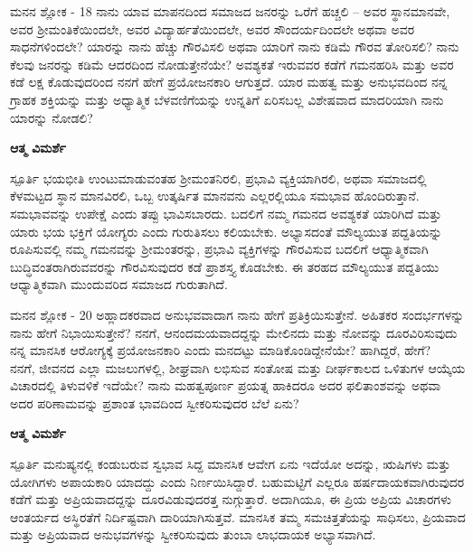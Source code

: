 \newpage
\begin{mananam}{\mananamfont ಮನನ ಶ್ಲೋಕ - \textenglish{18}}
\footnotesize \mananamtext ನಾನು ಯಾವ ಮಾಪನದಿಂದ ಸಮಾಜದ ಜನರನ್ನು ಒರೆಗೆ ಹಚ್ಚಲಿ – ಅವರ ಸ್ಥಾನಮಾನವೇ, ಅವರ ಶ್ರೀಮಂತಿಕೆಯಿಂದಲೇ, ಅವರ ವಿದ್ಯಾರ್ಹತೆಯಿಂದಲೇ, ಅವರ ಸೌಂದರ್ಯದಿಂದಲೇ ಅಥವಾ ಅವರ ಸಾಧನೆಗಳಿಂದಲೇ? ಯಾರನ್ನು ನಾನು ಹೆಚ್ಚು ಗೌರವಿಸಲಿ ಅಥವಾ ಯಾರಿಗೆ ನಾನು ಕಡಿಮೆ ಗೌರವ ತೋರಿಸಲಿ? ನಾನು ಕೆಲವು ಜನರನ್ನು ಕಡಿಮೆ ಆದರದಿಂದ ನೋಡುತ್ತೇನೆಯೇ? ಅವಶ್ಯಕತೆ ಇರುವವರ ಕಡೆಗೆ ಗಮನಹರಿಸಿ ಮತ್ತು ಅವರ ಕಡೆ ಲಕ್ಷ ಕೊಡುವುದರಿಂದ ನನಗೆ ಹೇಗೆ ಪ್ರಯೋಜನಕಾರಿ ಆಗುತ್ತದೆ. ಯಾರ ಮಹತ್ವ ಮತ್ತು ಅನುಭವದಿಂದ ನನ್ನ ಗ್ರಾಹಕ ಶಕ್ತಿಯನ್ನು ಮತ್ತು ಅಧ್ಯಾತ್ಮಿಕ ಬೆಳವಣಿಗೆಯನ್ನು ಉನ್ನತಿಗೆ ಏರಿಸಬಲ್ಲ ವಿಶೇಷವಾದ ಮಾದರಿಯಾಗಿ ನಾನು ಯಾರನ್ನು ನೋಡಲಿ?
\end{mananam}
\WritingHand\enspace\textbf{ಆತ್ಮ ವಿಮರ್ಶೆ}\\
\begin{inspiration}{\mananamfont ಸ್ಪೂರ್ತಿ}
\footnotesize \mananamtext ಭಯಭೀತಿ ಉಂಟುಮಾಡುವಂತಹ ಶ್ರೀಮಂತನಿರಲಿ, ಪ್ರಭಾವಿ ವ್ಯಕ್ತಿಯಾಗಿರಲಿ, ಅಥವಾ ಸಮಾಜದಲ್ಲಿ ಕೆಳಮಟ್ಟದ ಸ್ಥಾನ ಮಾನವಿರಲಿ, ಒಬ್ಬ ಉತ್ಕರ್ಷಿತ ಮಾನವನು ಎಲ್ಲರಲ್ಲಿಯೂ ಸಮಭಾವ ಹೊಂದಿರುತ್ತಾನೆ. \\
ಸಮಭಾವವನ್ನು ಉಪೇಕ್ಷೆ ಎಂದು ತಪ್ಪು ಭಾವಿಸಬಾರದು. ಬದಲಿಗೆ ನಮ್ಮ ಗಮನದ ಅವಶ್ಯಕತೆ ಯಾರಿಗಿದೆ ಮತ್ತು ಯಾರು ಭಯ ಭಕ್ತಿಗೆ ಯೋಗ್ಯರು ಎಂದು ಗುರುತಿಸಲು ಕಲಿಯಬೇಕು. ಅಭ್ಯಾಸದಂತೆ ಮೌಲ್ಯಯುತ ಪದ್ದತಿಯನ್ನು ರೂಪಿಸುವಲ್ಲಿ ನಮ್ಮ ಗಮನವನ್ನು ಶ್ರೀಮಂತರನ್ನು, ಪ್ರಭಾವಿ ವ್ಯಕ್ತಿಗಳನ್ನು ಗೌರವಿಸುವ ಬದಲಿಗೆ ಆಧ್ಯಾತ್ಮಿಕವಾಗಿ ಬುದ್ಧಿವಂತರಾಗಿರುವವರನ್ನು ಗೌರವಿಸುವುದರ ಕಡೆ ಪ್ರಾಶಸ್ತ್ಯ ಕೊಡಬೇಕು. ಈ ತರಹದ ಮೌಲ್ಯಯುತ ಪದ್ದತಿಯು ಆಧ್ಯಾತ್ಮಿಕವಾಗಿ ಮುಂದುವರಿದ ಸಮಾಜದ ಗುರುತಾಗಿದೆ.\\
\end{inspiration}
\newpage

\begin{mananam}{\mananamfont ಮನನ ಶ್ಲೋಕ - \textenglish{20}}
\footnotesize \mananamtext ಅಹ್ಲಾದಕರವಾದ ಅನುಭವವಾದಾಗ ನಾನು ಹೇಗೆ  ಪ್ರತಿಕ್ರಿಯಿಸುತ್ತೇನೆ.  ಅಹಿತಕರ ಸಂದರ್ಭಗಳನ್ನು  ನಾನು ಹೇಗೆ ನಿಭಾಯಿಸುತ್ತೇನೆ? ನನಗೆ, ಆನಂದಮಯವಾದದ್ದನ್ನು  ಮೇಲಿನದು ಮತ್ತು ನೋವನ್ನು ದೂರವಿರಿಸುವುದು ನನ್ನ ಮಾನಸಿಕ ಆರೋಗ್ಯಕ್ಕೆ ಪ್ರಯೋಜನಕಾರಿ ಎಂದು ಮನದಟ್ಟು ಮಾಡಿಕೊಂಡಿದ್ದೇನೆಯೇ? ಹಾಗಿದ್ದರೆ, ಹೇಗೆ?\\
ನನಗೆ, ಜೀವನದ ಎಲ್ಲಾ ಮಜಲುಗಳಲ್ಲಿ, ಶೀಘ್ರವಾಗಿ ಲಭಿಸುವ ಸಂತೋಷ ಮತ್ತು ದೀರ್ಘಕಾಲದ ಒಳಿತುಗಳ ಆಯ್ಕೆಯ ವಿಚಾರದಲ್ಲಿ ತಿಳುವಳಿಕೆ ಇದೆಯೇ? ನಾನು ಮಹತ್ವಪೂರ್ಣ ಪ್ರಯತ್ನ ಹಾಕಿದರೂ ಅದರ ಫಲಿತಾಂಶವನ್ನು ಅಥವಾ ಅದರ ಪರಿಣಾಮವನ್ನು ಪ್ರಶಾಂತ ಭಾವದಿಂದ ಸ್ವೀಕರಿಸುವುದರ ಬೆಲೆ ಏನು?
\end{mananam}
\WritingHand\enspace\textbf{ಆತ್ಮ ವಿಮರ್ಶೆ}\\
\begin{inspiration}{\mananamfont ಸ್ಪೂರ್ತಿ}
\footnotesize \mananamtext ಮನುಷ್ಯನಲ್ಲಿ ಕಂಡುಬರುವ ಸ್ವಭಾವ ಸಿದ್ದ ಮಾನಸಿಕ ಆವೇಗ ಏನು ಇದೆಯೋ ಅದನ್ನು, ಋಷಿಗಳು ಮತ್ತು ಯೋಗಿಗಳು ಅಪಾಯಕಾರಿ ಯಾದದ್ದು ಎಂದು  ನಿರ್ಣಯಿಸಿದ್ದಾರೆ.  ಬಹುಮಟ್ಟಿಗೆ ಎಲ್ಲರೂ ಹರ್ಷದಾಯಕವಾಗಿರುವುದರ ಕಡೆಗೆ ಮತ್ತು ಅಪ್ರಿಯವಾದದ್ದನ್ನು ದೂರವಿಡುವುದರತ್ತ ನುಗ್ಗುತ್ತಾರೆ. ಅದಾಗಿಯೂ,  ಈ ಪ್ರಿಯ ಅಪ್ರಿಯ  ವಿಚಾರಗಳು ಆಂತರ್ಯದ ಅಸ್ಥಿರತೆಗೆ ನಿರ್ದಿಷ್ಟವಾಗಿ ದಾರಿಯಾಗಿಸುತ್ತವೆ. ಮಾನಸಿಕ ತಮ್ಮ ಸಮಚಿತ್ತತೆಯನ್ನು  ಸಾಧಿಸಲು, ಪ್ರಿಯವಾದ ಮತ್ತು ಅಪ್ರಿಯವಾದ ಅನುಭವಗಳನ್ನು ಸ್ವೀಕರಿಸುವುದು ತುಂಬಾ ಲಾಭದಾಯಕ ಅಭ್ಯಾಸವಾಗಿದೆ.\\
\end{inspiration}
\newpage

